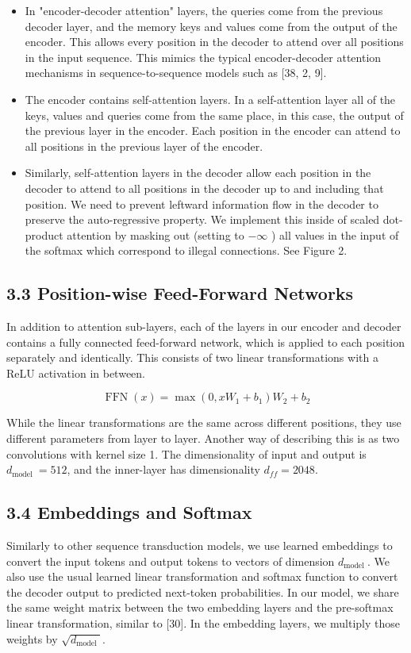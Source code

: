 \documentclass[10pt]{article}
\begin{document}
\begin{itemize}
  \item In "encoder-decoder attention" layers, the queries come from the previous decoder layer, and the memory keys and values come from the output of the encoder. This allows every position in the decoder to attend over all positions in the input sequence. This mimics the typical encoder-decoder attention mechanisms in sequence-to-sequence models such as [38, 2, 9].
  \item The encoder contains self-attention layers. In a self-attention layer all of the keys, values and queries come from the same place, in this case, the output of the previous layer in the encoder. Each position in the encoder can attend to all positions in the previous layer of the encoder.
  \item Similarly, self-attention layers in the decoder allow each position in the decoder to attend to all positions in the decoder up to and including that position. We need to prevent leftward information flow in the decoder to preserve the auto-regressive property. We implement this inside of scaled dot-product attention by masking out (setting to $-\infty$ ) all values in the input of the softmax which correspond to illegal connections. See Figure 2.
\end{itemize}

\subsection*{3.3 Position-wise Feed-Forward Networks}
In addition to attention sub-layers, each of the layers in our encoder and decoder contains a fully connected feed-forward network, which is applied to each position separately and identically. This consists of two linear transformations with a ReLU activation in between.

\[
\operatorname{FFN}(x)=\max \left(0, x W_{1}+b_{1}\right) W_{2}+b_{2}
\]

While the linear transformations are the same across different positions, they use different parameters from layer to layer. Another way of describing this is as two convolutions with kernel size 1. The dimensionality of input and output is $d_{\text {model }}=512$, and the inner-layer has dimensionality $d_{f f}=2048$.

\subsection*{3.4 Embeddings and Softmax}
Similarly to other sequence transduction models, we use learned embeddings to convert the input tokens and output tokens to vectors of dimension $d_{\text {model }}$. We also use the usual learned linear transformation and softmax function to convert the decoder output to predicted next-token probabilities. In our model, we share the same weight matrix between the two embedding layers and the pre-softmax linear transformation, similar to [30]. In the embedding layers, we multiply those weights by $\sqrt{d_{\text {model }}}$.
\end{document}
